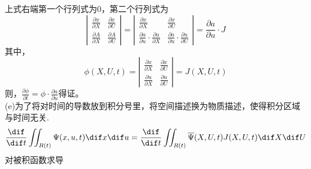 \documentclass[12pt]{article}
\begin{document}
上式右端第一个行列式为0，第二个行列式为
$$
{\left|
	\begin{array}{ccc}
		\frac{\partial x}{\partial X} & \frac{\partial x}{\partial U}\\
		\frac{\partial A}{\partial X} & \frac{\partial A}{\partial U}
	\end{array} 	
	\right |} = 
{\left|
	\begin{array}{ccc}
		\frac{\partial x}{\partial X} & \frac{\partial x}{\partial U}\\
		\frac{\partial a}{\partial u}\cdot\frac{\partial u}{\partial X} & \frac{\partial a}{\partial u}\cdot\frac{\partial u}{\partial U}
	\end{array} 	
	\right |} = 
\frac{\partial a}{\partial u}\cdot J
$$
其中，
$$\phi(X,U,t) = 
{\left|
	\begin{array}{ccc}
		\frac{\partial x}{\partial X} & \frac{\partial x}{\partial U}\\
		\frac{\partial u}{\partial X} & \frac{\partial u}{\partial U}
	\end{array} 	
	\right |} = 
J(X,U,t)
$$
则，$\frac{\partial \phi}{\partial t} = \phi\cdot\frac{\partial a}{\partial u}
$得证。
\\(e)为了将对时间的导数放到积分号里，将空间描述换为物质描述，使得积分区域与时间无关.
$$
\frac{\dif }{\dif t}\iint_{R(t)} \Psi(x,u,t)\dif x\dif u = \frac{\dif }{\dif t} \iint_{R(t)} \overline\Psi(X,U,t)J(X,U,t)\dif X\dif U
$$
对被积函数求导
\end{document}
